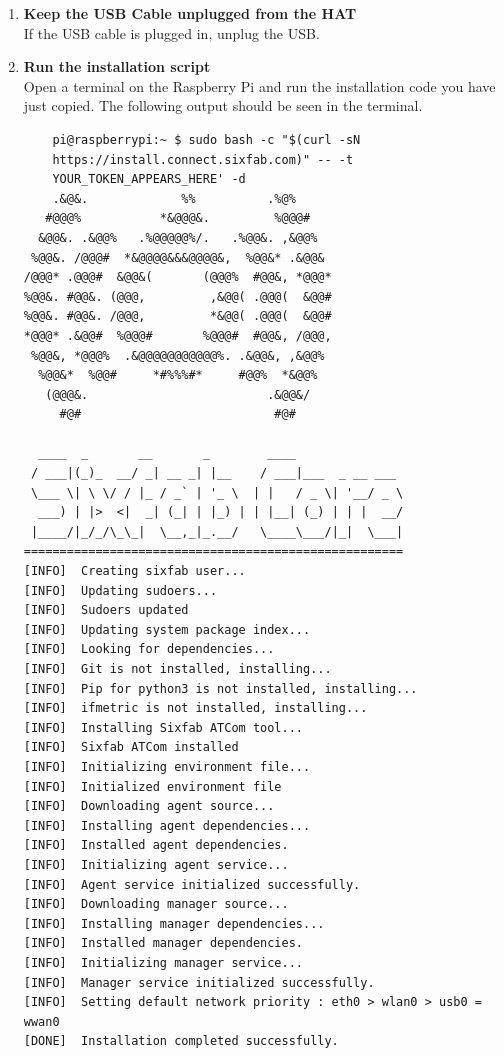 \documentclass[12pt, letterpaper]{article}
\begin{document}
{{\begin{enumerate}[label=\large{\textbf{\arabic*}.}]
\begin{figure}[h!]
	\caption{Device and Region selection and Unique installation code}
	\end{figure}	
	\item \textbf{\large{Keep the USB Cable unplugged from the HAT}} \\[1\baselineskip]
	\noindent If the USB cable is plugged in, unplug the USB.
	\item \textbf{\large{Run the installation script}} \\[1\baselineskip]
	Open a terminal on the Raspberry Pi and run the installation code you have just copied. The following output should be seen in the terminal.
	\begin{verbatim}
	pi@raspberrypi:~ $ sudo bash -c "$(curl -sN 
	https://install.connect.sixfab.com)" -- -t 
	YOUR_TOKEN_APPEARS_HERE' -d
    .&@&.             %%          .%@%           
   #@@@%           *&@@@&.         %@@@#         
  &@@&. .&@@%   .%@@@@@%/.   .%@@&. ,&@@%        
 %@@&. /@@@#  *&@@@@&&&@@@@&,  %@@&* .&@@&       
/@@@* .@@@#  &@@&(       (@@@%  #@@&, *@@@*      
%@@&. #@@&. (@@@,         ,&@@( .@@@(  &@@#      
%@@&. #@@&. /@@@,         *&@@( .@@@(  &@@#      
*@@@* .&@@#  %@@@#       %@@@#  #@@&, /@@@,      
 %@@&, *@@@%  .&@@@@@@@@@@@%. .&@@&, ,&@@%       
  %@@&*  %@@#     *#%%%#*     #@@%  *&@@%        
   (@@@&.                         .&@@&/         
     #@#                           #@#    

  ____  _       __       _        ____               
 / ___|(_)_  __/ _| __ _| |__    / ___|___  _ __ ___ 
 \___ \| \ \/ / |_ / _` | '_ \  | |   / _ \| '__/ _ \
  ___) | |>  <|  _| (_| | |_) | | |__| (_) | | |  __/
 |____/|_/_/\_\_|  \__,_|_.__/   \____\___/|_|  \___|
=====================================================
[INFO]  Creating sixfab user...
[INFO]  Updating sudoers...
[INFO]  Sudoers updated
[INFO]  Updating system package index...
[INFO]  Looking for dependencies...
[INFO]  Git is not installed, installing...
[INFO]  Pip for python3 is not installed, installing...
[INFO]  ifmetric is not installed, installing...
[INFO]  Installing Sixfab ATCom tool...
[INFO]  Sixfab ATCom installed
[INFO]  Initializing environment file...
[INFO]  Initialized environment file
[INFO]  Downloading agent source...
[INFO]  Installing agent dependencies...
[INFO]  Installed agent dependencies.
[INFO]  Initializing agent service...
[INFO]  Agent service initialized successfully.
[INFO]  Downloading manager source...
[INFO]  Installing manager dependencies...
[INFO]  Installed manager dependencies.
[INFO]  Initializing manager service...
[INFO]  Manager service initialized successfully.
[INFO]  Setting default network priority : eth0 > wlan0 > usb0 = wwan0
[DONE]  Installation completed successfully.


\end{verbatim}
\end{enumerate}}}
\end{document}
